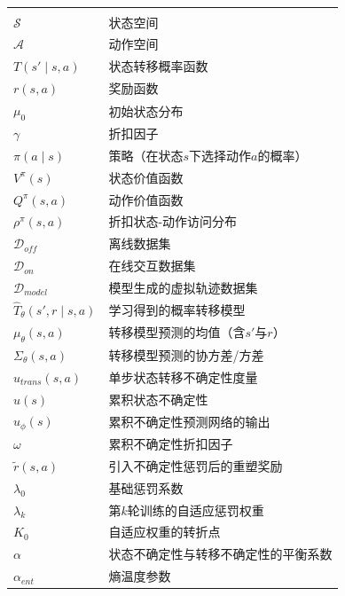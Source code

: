 \begin{denoabbre}

   \vspace{-13pt} \\

  \begin{supertabular}{p{4cm}p{9cm}}
    {\textbf{}}  &  {\textbf{}}    \\
    $\mathcal{S}$  &  状态空间 \\
    $\mathcal{A}$  &  动作空间 \\
    $T(s'\mid s,a)$  &  状态转移概率函数 \\
    $r(s,a)$  &  奖励函数 \\
    $\mu_0$  &  初始状态分布 \\
    $\gamma$  &  折扣因子 \\
    $\pi(a\mid s)$  &  策略（在状态$s$下选择动作$a$的概率） \\
    $V^\pi(s)$  &  状态价值函数 \\
    $Q^\pi(s,a)$  &  动作价值函数 \\
    $\rho^\pi(s,a)$  &  折扣状态-动作访问分布 \\
    $\mathcal{D}_{off}$  &  离线数据集 \\
    $\mathcal{D}_{on}$  &  在线交互数据集 \\
    $\mathcal{D}_{model}$  &  模型生成的虚拟轨迹数据集 \\
    $\hat{T}_\theta(s',r\mid s,a)$  &  学习得到的概率转移模型 \\
    $\mu_\theta(s,a)$  &  转移模型预测的均值（含$s'$与$r$） \\
    $\Sigma_\theta(s,a)$  &  转移模型预测的协方差/方差 \\
    $u_{trans}(s,a)$  &  单步状态转移不确定性度量 \\
    $u(s)$  &  累积状态不确定性 \\
    $u_\phi(s)$  &  累积不确定性预测网络的输出 \\
    $\omega$  &  累积不确定性折扣因子 \\
    $\tilde{r}(s,a)$  &  引入不确定性惩罚后的重塑奖励 \\
    $\lambda_0$  &  基础惩罚系数 \\
    $\lambda_k$  &  第$k$轮训练的自适应惩罚权重 \\
    $K_0$  &  自适应权重的转折点 \\
    $\alpha$  &  状态不确定性与转移不确定性的平衡系数 \\
    $\alpha_{ent}$  &  熵温度参数 \\

\end{supertabular}
\end{denoabbre}
